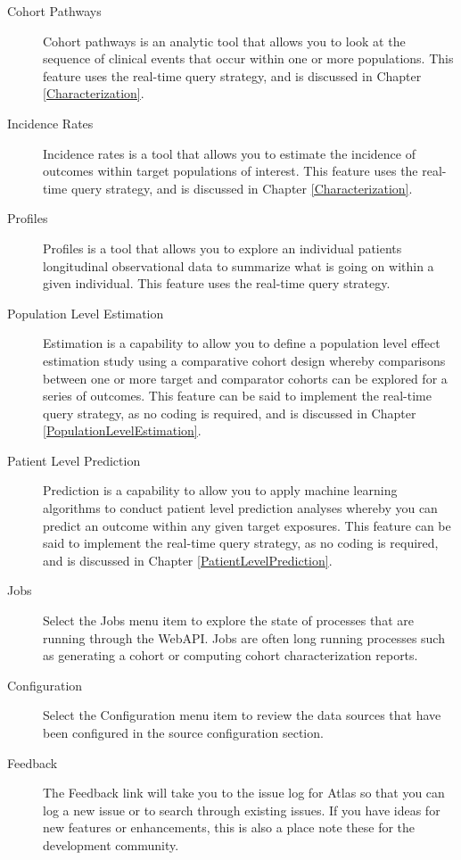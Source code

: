 \documentclass[11pt]{book}
\theoremstyle{definition}
\theoremstyle{definition}
\theoremstyle{definition}
\theoremstyle{remark}
\begin{document}
\begin{description}
\item[Cohort Pathways ]
Cohort pathways is an analytic tool that allows you to look at the sequence of clinical events that occur within one or more populations. This feature uses the real-time query strategy, and is discussed in Chapter \ref{Characterization}.
\item[Incidence Rates ]
Incidence rates is a tool that allows you to estimate the incidence of outcomes within target populations of interest. This feature uses the real-time query strategy, and is discussed in Chapter \ref{Characterization}.
\item[Profiles ]
Profiles is a tool that allows you to explore an individual patients longitudinal observational data to summarize what is going on within a given individual. This feature uses the real-time query strategy.
\item[Population Level Estimation ]
Estimation is a capability to allow you to define a population level effect estimation study using a comparative cohort design whereby comparisons between one or more target and comparator cohorts can be explored for a series of outcomes. This feature can be said to implement the real-time query strategy, as no coding is required, and is discussed in Chapter \ref{PopulationLevelEstimation}.
\item[Patient Level Prediction ]
Prediction is a capability to allow you to apply machine learning algorithms to conduct patient level prediction analyses whereby you can predict an outcome within any given target exposures. This feature can be said to implement the real-time query strategy, as no coding is required, and is discussed in Chapter \ref{PatientLevelPrediction}.
\item[Jobs ]
Select the Jobs menu item to explore the state of processes that are running through the WebAPI. Jobs are often long running processes such as generating a cohort or computing cohort characterization reports.
\item[Configuration ]
Select the Configuration menu item to review the data sources that have been configured in the source configuration section.
\item[Feedback ]
The Feedback link will take you to the issue log for Atlas so that you can log a new issue or to search through existing issues. If you have ideas for new features or enhancements, this is also a place note these for the development community.
\end{description}
\end{document}
